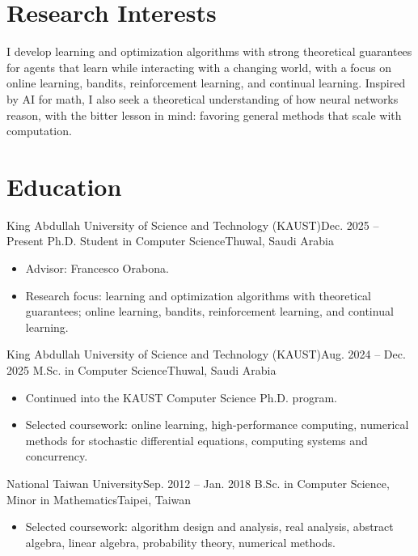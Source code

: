 \documentclass[10pt, letterpaper]{article}
\begin{document}

\section{Research Interests}
\small{
I develop learning and optimization algorithms with strong theoretical
guarantees for agents that learn while interacting with a changing world, with
a focus on online learning, bandits, reinforcement learning, and continual
learning. Inspired by AI for math, I also seek a theoretical understanding of
how neural networks reason, with the bitter lesson in mind: favoring general
methods that scale with computation.
}

\section{Education}
\entry
{King Abdullah University of Science and Technology (KAUST)}{Dec. 2025 -- Present}
{Ph.D. Student in Computer Science}{Thuwal, Saudi Arabia}
\begin{itemize}
  \item Advisor: Francesco Orabona.
  \item Research focus: learning and optimization algorithms with theoretical guarantees; online learning, bandits, reinforcement learning, and continual learning.
\end{itemize}

\entry
{King Abdullah University of Science and Technology (KAUST)}{Aug. 2024 -- Dec. 2025}
{M.Sc. in Computer Science}{Thuwal, Saudi Arabia}
\begin{itemize}
  \item Continued into the KAUST Computer Science Ph.D. program.
  \item Selected coursework: online learning, high-performance computing, numerical methods for stochastic differential equations, computing systems and concurrency.
\end{itemize}

\entry
{National Taiwan University}{Sep. 2012 -- Jan. 2018}
{B.Sc. in Computer Science, Minor in Mathematics}{Taipei, Taiwan}
\begin{itemize}
  \item Selected coursework: algorithm design and analysis, real analysis, abstract algebra, linear algebra, probability theory, numerical methods.
\end{itemize}
\end{document}
